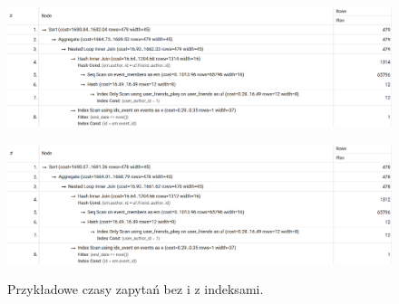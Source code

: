 \documentclass{article}
\begin{document}
\begin{figure}[htbp]
    \centering
    \begin{minipage}{0.45\textwidth}
        \centering
        \includegraphics[width=\linewidth]{images/index_show_events_with_friends_before.png}
        \label{fig:index_show_events_with_friends_before}
    \end{minipage}
    \hfill
    \begin{minipage}{0.45\textwidth}
        \centering
        \includegraphics[width=\linewidth]{images/index_show_events_with_friends_after.png}
        \label{fig:index_show_events_with_friends_after}
    \end{minipage}
    \caption{Przykładowe czasy zapytań bez i z indeksami.}
\end{figure}
\end{document}
